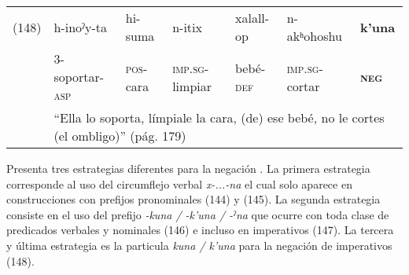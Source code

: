 {%
\begin{tabular}{lllllll}
(148) & h-inoˀy-ta & hi-suma & n-itix & xalall-op & n-akʰohoshu & \textbf{k’una} \\
& \textsc{3-}soportar-\textsc{asp} & \textsc{pos}-cara & \textsc{imp.sg-}limpiar & bebé-\textsc{def} & \textsc{imp.sg-}cortar & \textsc{\textbf{neg}} \\
& \multicolumn{6}{l}{``Ella lo soporta, límpiale la cara, (de) ese bebé, no le cortes (el ombligo)'' (pág. 179)}
\end{tabular} \vspace{0.5cm}

}

Presenta tres estrategias diferentes para la negación \textcolor{MidnightBlue}{\citep{chimariko}}. La primera estrategia corresponde al uso del circumflejo verbal {\setmainfont{Charis SIL} \textit{x-...-na}} el cual solo aparece en construcciones con prefijos pronominales (144) y (145). La segunda estrategia consiste en el uso del prefijo {\setmainfont{Charis SIL} \textit{-kuna / -k'una / -ˀna}} que ocurre con toda clase de predicados verbales y nominales (146) e incluso en imperativos (147). La tercera y última estrategia es la particula {\setmainfont{Charis SIL} \textit{kuna / k'una}} para la negación de imperativos (148).